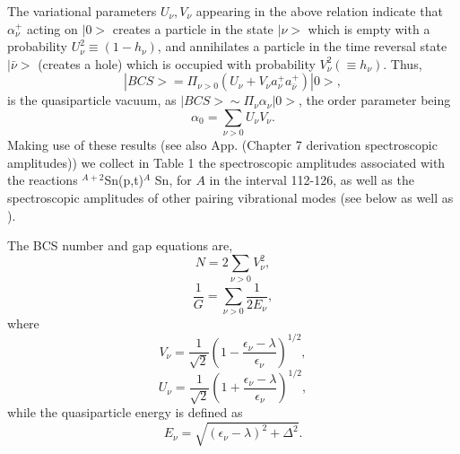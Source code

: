 \documentclass[a4paper,14pt]{book}
\begin{document}
The variational parameters $U_{\nu},V_{\nu}$ appearing in the above
relation indicate that $\alpha^+_{\nu}$ acting on $|0>$ creates a particle 
in the state $|\nu>$ which is empty with a probability $U^2_{\nu} \equiv (1 -h_{\nu})$, and annihilates a particle in the time reversal state $|\bar \nu>$
(creates a hole) which is occupied with probability $V_{\nu}^2 (\equiv h_{\nu})$. Thus, 
\begin{equation}
|BCS> = \Pi_{\nu>0} (U_{\nu} +V_{\nu} a^+_{\nu}a^+_{\bar \nu}) |0>,
\end{equation}
is the quasiparticle vacuum, as $|BCS> \sim \Pi_{\nu} \alpha_{\nu} |0>$, the order parameter being 
\begin{equation}
\alpha_0 = \sum_{\nu>0} U_{\nu}V_{\nu}.
\label{UV}
\end{equation}
Making use of these results (see also App. (Chapter 7 derivation spectroscopic amplitudes)) we collect in Table 1  the spectroscopic amplitudes associated with  the reactions  
$^{A+2}$Sn(p,t)$^A$ Sn, for $A$ in the interval 112-126, as well as the spectroscopic amplitudes of other pairing vibrational modes (see below as well as \cite{Barranco:01,Gori:04}).

The BCS number and gap equations are,
\begin{equation}
N = 2 \sum_{\nu>0} V_{\nu}^2,
\label{numb}
\end{equation}  
\begin{equation}
\frac{1}{G} = \sum_{\nu>0} \frac{1}{2 E_{\nu}},
\end{equation}
where 
\begin{equation}
V_{\nu} = \frac{1}{\sqrt{2}} \left( 1 - \frac{\epsilon_{\nu} - \lambda}{\epsilon_{\nu}} \right)^{1/2},
\end{equation}
\begin{equation}
U_{\nu} = \frac{1}{\sqrt{2}} \left( 1 + \frac{\epsilon_{\nu} - \lambda}{\epsilon_{\nu}} \right)^{1/2},
\end{equation}
while the quasiparticle energy  is defined as 
\begin{equation}
E_{\nu} = \sqrt{(\epsilon_{\nu} - \lambda)^2 + \Delta^2}.
\label{eqp}
\end{equation}
\end{document}

